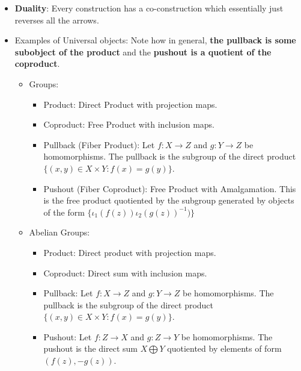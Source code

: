 \documentclass[11pt, oneside]{amsart}   	%
\theoremstyle{definition}
\begin{document}
\begin{itemize}
	\item \textbf{Duality}: Every construction has a co-construction which essentially just reverses all the arrows.
	
	\item Examples of Universal objects: Note how in general, \textbf{the pullback is some subobject of the product} and the \textbf{pushout is a 
	quotient of the coproduct}.
	
		\begin{itemize}
		
			\item Groups:
			
				\begin{itemize}
					
					\item Product: Direct Product with projection maps.
					
					\item Coproduct: Free Product with inclusion maps.
					
					\item Pullback (Fiber Product): Let $f: X\rightarrow Z$ and $g: Y\rightarrow Z$ be homomorphisms. The pullback is the 
					subgroup of the direct product $\{(x, y)\in X\times Y : f(x) = g(y)\}$.
					
					\item Pushout (Fiber Coproduct): Free Product with Amalgamation. This is the free product quotiented by the subgroup 
					generated by objects of the form $\{\iota_1(f(z))\iota_2(g(z))^{-1})\}$
					
				\end{itemize}
			
			\item Abelian Groups:
			
				\begin{itemize}
				
					\item Product: Direct product with projection maps.
					
					\item Coproduct: Direct sum with inclusion maps.
					
					\item Pullback: Let $f: X\rightarrow Z$ and $g: Y\rightarrow Z$ be homomorphisms. The pullback is the subgroup of the 
					direct product $\{(x, y)\in X\times Y : f(x) = g(y)\}$.
					
					\item Pushout: Let $f: Z\rightarrow X$ and $g: Z\rightarrow Y$ be homomorphisms. The pushout is the direct sum $X
					\bigoplus Y$ quotiented by elements of form $(f(z), -g(z))$.
				

\end{itemize}
\end{itemize}
\end{itemize}
\end{document}

